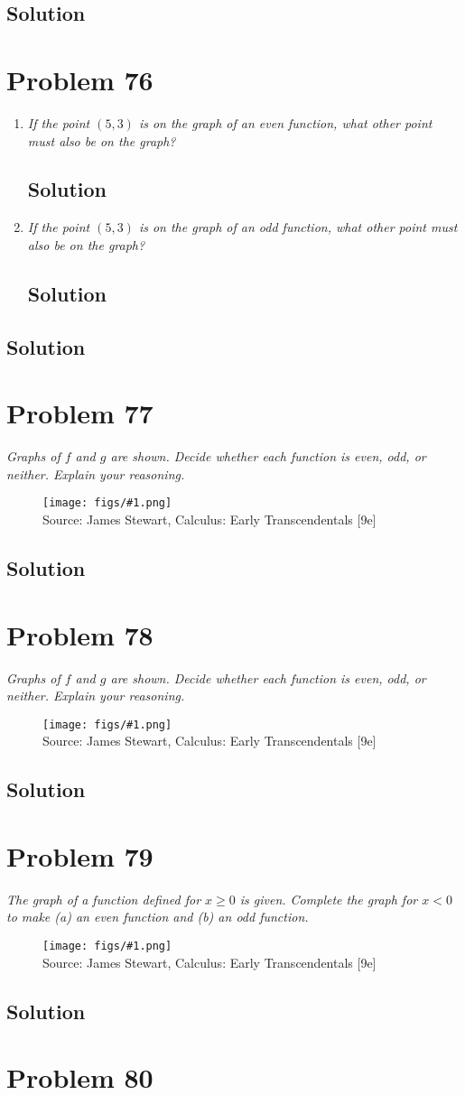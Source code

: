 \documentclass[11pt]{article}
\newcommand{\soln}{\subsection*}
\newcommand{\qn}{\textit}
\newcommand{\imagesource}[1]{{\footnotesize Source: #1}}
\newcommand{\imgqn}[1]{
	\begin{figure}[h]
		\centering
		\texttt{[image: figs/\#1.png]}\\
		\imagesource{James Stewart, Calculus: Early Transcendentals [9e]}
	\end{figure}
}
\begin{document}
\soln{Solution}

\section*{Problem 76}

\begin{enumerate}
	\item \qn{If the point $(5,3)$ is on the graph of an even function, what other point must also be on the graph?}
	\soln{Solution}
	
	\item \qn{If the point $(5,3)$ is on the graph of an odd function, what other point must also be on the graph?}
	\soln{Solution}
\end{enumerate}

\soln{Solution}

\section*{Problem 77}

\qn{Graphs of $f$ and $g$ are shown. Decide whether each function is even, odd, or neither. Explain your reasoning.}

\imgqn{1.1.77}

\soln{Solution}

\section*{Problem 78}

\qn{Graphs of $f$ and $g$ are shown. Decide whether each function is even, odd, or neither. Explain your reasoning.}

\imgqn{1.1.78}

\soln{Solution}

\section*{Problem 79}

\qn{The graph of a function defined for $x \ge 0$ is given. Complete the graph for $x<0$ to make (a) an even function and (b) an odd function.}

\imgqn{1.1.79}

\soln{Solution}

\section*{Problem 80}
\end{document}
